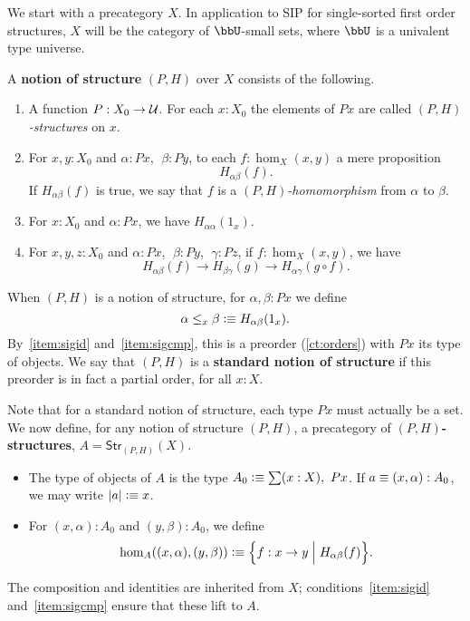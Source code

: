 We start with a precategory $X$.  In application to SIP for
single-sorted first order structures, $X$ will be the category %
of $\bbU$-small sets, where $\bbU$ is a univalent type universe.

\begin{defn}\label{ct:sig}
  A \textbf{notion of structure} $(P,H)$ over $X$ consists of the following.
  \begin{enumerate}
  \item A function $P:X_0 \to \mathcal{U}$.
    For each $x:X_0$ the elements of $Px$ are called \emph{$(P,H)$-structures} on $x$.
  \item For $x,y:X_0$ and $\alpha:Px$, $\;\beta:Py$, to each $f:\hom_X(x,y)$ a mere proposition 
  \[ H_{\alpha\beta}(f).\]
    If $H_{\alpha\beta}(f)$ is true, we say that $f$ is a \emph{$(P,H)$-homomorphism} from $\alpha$ to $\beta$.
  \item For $x:X_0$ and $\alpha:Px$, we have $H_{\alpha\alpha}(1_x)$.\label{item:sigid}
  \item For $x,y,z:X_0$ and $\alpha:Px$, $\;\beta:Py$, $\;\gamma:Pz$, 
if $f:\hom_X(x,y)$, we have 
  \[ H_{\alpha\beta}(f)\to H_{\beta\gamma}(g)\to H_{\alpha\gamma}(g\circ   f).\]\label{item:sigcmp}  
   \end{enumerate}
  When $(P,H)$ is a notion of structure, for $\alpha,\beta:Px$ we define
  \[ \alpha\leq_x\beta \vcentcolon\equiv H_{\alpha\beta}(1_x).\]
  By~\ref{item:sigid} and~\ref{item:sigcmp}, this is a preorder (\autoref{ct:orders}) with $Px$ its type of objects.
  We say that $(P,H)$ is a \textbf{standard notion of structure} if this preorder is in fact a partial order, for all $x:X$.
\end{defn}

Note that for a standard notion of structure, each type $Px$ must actually be a set.
We now define, for any notion of structure $(P,H)$, a precategory of \textbf{$(P,H)$-structures}, $A = \mathsf{Str}_{(P,H)}(X)$.
\begin{itemize}
\item The type of objects of $A$ is the type $A_0 \defeq \sm{x:X} Px$.
  If $a\equiv (x,\alpha):A_0$, we may write $|a| \vcentcolon\equiv x$.
\item For $(x,\alpha):A_0$ and $(y,\beta):A_0$, we define
  \[\hom_A((x,\alpha),(y,\beta)) \vcentcolon\equiv \Big\{f:x \to y \;\Big|\; H_{\alpha\beta}(f)\Big\}.\]
\end{itemize}
The composition and identities are inherited from $X$; conditions~\ref{item:sigid} and~\ref{item:sigcmp} ensure that these lift to $A$.

